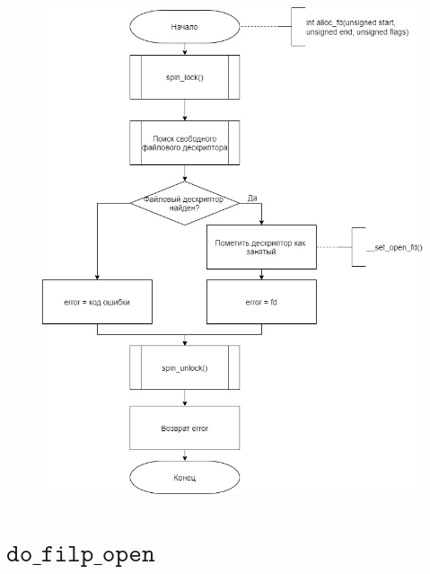 \documentclass[a4paper,14pt]{extreport}
\begin{document}
\begin{figure}[H]
	\centering
	\includegraphics[scale=0.6]{img/alloc_fd.jpg}
	\label{fig:alloc_fd}
\end{figure}













\section{$\texttt{do\_filp\_open}$}
\end{document}
